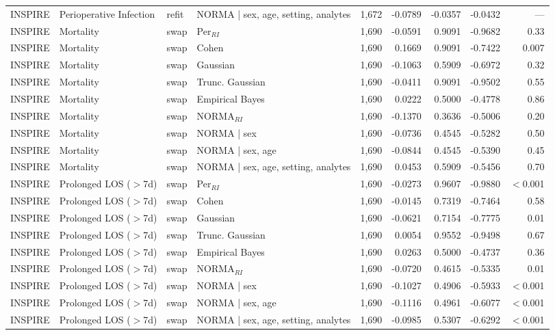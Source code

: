 \begin{table}[ht]
\begin{tabular}{ll l l r r r r r}
INSPIRE & Perioperative Infection & refit & NORMA | sex, age, setting, analytes & 1,672 & -0.0789 & -0.0357 & -0.0432 & --- \\
INSPIRE & Mortality & swap & Per$_{RI}$ & 1,690 & -0.0591 & 0.9091 & -0.9682 & 0.33 \\
INSPIRE & Mortality & swap & Cohen & 1,690 & 0.1669 & 0.9091 & -0.7422 & 0.007 \\
INSPIRE & Mortality & swap & Gaussian & 1,690 & -0.1063 & 0.5909 & -0.6972 & 0.32 \\
INSPIRE & Mortality & swap & Trunc. Gaussian & 1,690 & -0.0411 & 0.9091 & -0.9502 & 0.55 \\
INSPIRE & Mortality & swap & Empirical Bayes & 1,690 & 0.0222 & 0.5000 & -0.4778 & 0.86 \\
INSPIRE & Mortality & swap & NORMA$_{RI}$ & 1,690 & -0.1370 & 0.3636 & -0.5006 & 0.20 \\
INSPIRE & Mortality & swap & NORMA | sex & 1,690 & -0.0736 & 0.4545 & -0.5282 & 0.50 \\
INSPIRE & Mortality & swap & NORMA | sex, age & 1,690 & -0.0844 & 0.4545 & -0.5390 & 0.45 \\
INSPIRE & Mortality & swap & NORMA | sex, age, setting, analytes & 1,690 & 0.0453 & 0.5909 & -0.5456 & 0.70 \\
INSPIRE & Prolonged LOS ($>$7d) & swap & Per$_{RI}$ & 1,690 & -0.0273 & 0.9607 & -0.9880 & $<$0.001 \\
INSPIRE & Prolonged LOS ($>$7d) & swap & Cohen & 1,690 & -0.0145 & 0.7319 & -0.7464 & 0.58 \\
INSPIRE & Prolonged LOS ($>$7d) & swap & Gaussian & 1,690 & -0.0621 & 0.7154 & -0.7775 & 0.01 \\
INSPIRE & Prolonged LOS ($>$7d) & swap & Trunc. Gaussian & 1,690 & 0.0054 & 0.9552 & -0.9498 & 0.67 \\
INSPIRE & Prolonged LOS ($>$7d) & swap & Empirical Bayes & 1,690 & 0.0263 & 0.5000 & -0.4737 & 0.36 \\
INSPIRE & Prolonged LOS ($>$7d) & swap & NORMA$_{RI}$ & 1,690 & -0.0720 & 0.4615 & -0.5335 & 0.01 \\
INSPIRE & Prolonged LOS ($>$7d) & swap & NORMA | sex & 1,690 & -0.1027 & 0.4906 & -0.5933 & $<$0.001 \\
INSPIRE & Prolonged LOS ($>$7d) & swap & NORMA | sex, age & 1,690 & -0.1116 & 0.4961 & -0.6077 & $<$0.001 \\
INSPIRE & Prolonged LOS ($>$7d) & swap & NORMA | sex, age, setting, analytes & 1,690 & -0.0985 & 0.5307 & -0.6292 & $<$0.001 \\

\end{tabular}
\end{table}
